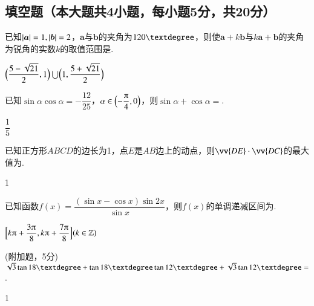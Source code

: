 \begin{exercise}
  \section{填空题（本大题共4小题，每小题5分，共20分）}
    \item%
       已知$\left| \bm a \right|=1,\left| \bm b \right|=2$，$\bm a$与$\bm b$的夹角为$120\textdegree$，则使$\bm a+k\bm b$与$k\bm a+\bm b$的夹角为锐角的实数$k$的取值范围是\tk[5].
      \begin{answer}
        $\Bigl(\dfrac{5-\sqrt{21}}2,1\Bigr)\bigcup\Bigl(1,\dfrac{5+\sqrt{21}}2\Bigr)$
      \end{answer}
    \item%
      已知$\sin\alpha\cos\alpha=-\dfrac{12}{25}$，$\alpha\in\Bigl(-\dfrac{\piup}4,0\Bigr)$，则$\sin\alpha+\cos\alpha=$\tk.
      \begin{answer}
        $\dfrac{1}{5}$
      \end{answer}
    \item%
       已知正方形$ABCD$的边长为1，点$E$是$AB$边上的动点，则$\vv{DE}\cdot\vv{DC}$的最大值为\tk.
       \begin{answer}
         1
       \end{answer}
    \item%
       已知函数$f(x)=\dfrac{(\sin x-\cos x)\sin {2x}}{\sin x}$，则$f(x)$的单调递减区间为\tk[6].
      \begin{answer}
        $\Bigl[k\piup+\dfrac{3\piup}8,k\piup+\dfrac{7\piup}8\Bigr](k\in\mathbb{Z})$
      \end{answer}
    \item%
      (附加题，5分)
      $\sqrt3\tan{18\textdegree}+\tan{18\textdegree}\tan{12\textdegree}+\sqrt3\tan{12\textdegree}=$\tk.
      \begin{answer}
        1
      \end{answer}
  \clearpage

\end{exercise}

